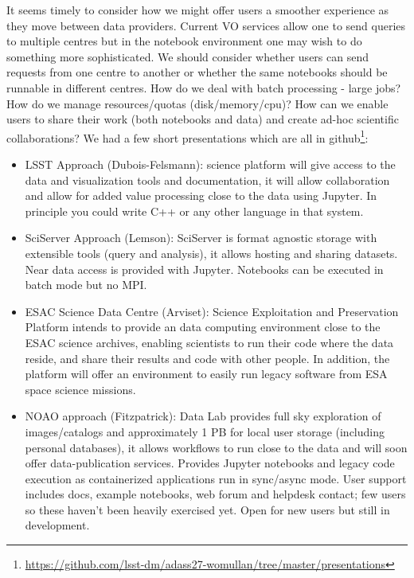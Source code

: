\documentclass[11pt,twoside]{article}
\begin{document}
It seems timely to consider how we might offer users a smoother experience as they move between data providers.
Current VO services allow one to send queries to multiple centres but in the notebook environment one may wish to do something more sophisticated. We should consider whether users can send requests from one centre to another or whether the same notebooks should be runnable in different centres.
How do we deal with batch processing - large jobs? How do we manage resources/quotas (disk/memory/cpu)?  How can we enable users to share their work (both notebooks and data) and create ad-hoc scientific collaborations?
We had a few short presentations which are all in github\footnote{\url{https://github.com/lsst-dm/adass27-womullan/tree/master/presentations}}:
\begin{itemize}
\item LSST Approach (Dubois-Felsmann): science platform will give access to the data and visualization tools and documentation, it will allow collaboration and allow for added value processing close to the data using Jupyter. In principle you could write C++ or any other language in that system.

\item SciServer Approach (Lemson): SciServer is format agnostic storage with extensible tools (query and analysis), it allows hosting and sharing datasets. Near data access is provided with Jupyter. Notebooks can be executed in batch mode but no MPI.

\item ESAC Science Data Centre (Arviset): Science Exploitation and Preservation Platform intends to provide an data computing environment close to the ESAC science archives, enabling scientists to run their code where the data reside, and share their results and code with other people. In addition, the platform will offer an environment to easily run legacy software from ESA space science missions.



\item NOAO approach (Fitzpatrick): Data Lab provides full sky exploration of images/catalogs and approximately 1 PB for local user storage (including personal databases), it allows workflows to run close to the data and will soon offer data-publication services. Provides Jupyter notebooks and legacy code execution as containerized applications run in sync/async mode. User support includes docs, example notebooks, web forum and helpdesk contact; few users so these haven't been heavily exercised yet.  Open for new users but still in development.



\end{itemize}
\end{document}
